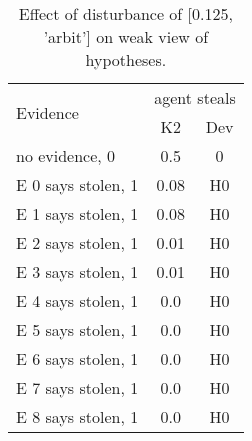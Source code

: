 \begin{table}\begin{tabular}{l|cc}\toprule\multirow{2}{*}{Evidence} & \multicolumn{2}{c}{agent steals}\\& {K2} & {Dev}\\\midrule
no evidence, 0 & \cellcolor{Bittersweet}0.5&\cellcolor{Bittersweet}0\\E 0 says stolen, 1 & \cellcolor{Bittersweet}0.08&\cellcolor{Bittersweet}H0\\E 1 says stolen, 1 & \cellcolor{Bittersweet}0.08&\cellcolor{Bittersweet}H0\\E 2 says stolen, 1 & \cellcolor{Bittersweet}0.01&\cellcolor{Bittersweet}H0\\E 3 says stolen, 1 & \cellcolor{Bittersweet}0.01&\cellcolor{Bittersweet}H0\\E 4 says stolen, 1 & \cellcolor{Bittersweet}0.0&\cellcolor{Bittersweet}H0\\E 5 says stolen, 1 & \cellcolor{Bittersweet}0.0&\cellcolor{Bittersweet}H0\\E 6 says stolen, 1 & \cellcolor{Bittersweet}0.0&\cellcolor{Bittersweet}H0\\E 7 says stolen, 1 & \cellcolor{Bittersweet}0.0&\cellcolor{Bittersweet}H0\\E 8 says stolen, 1 & \cellcolor{Bittersweet}0.0&\cellcolor{Bittersweet}H0\\\bottomrule\end{tabular}\caption{Effect of disturbance of [0.125, 'arbit'] on weak view of hypotheses.}\end{table}